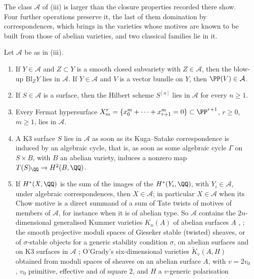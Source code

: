 The class $\mathcal{A}$ of (iii) is larger than the
closure properties recorded there show. Four further operations
preserve it, the last of them domination by correspondences, which brings in
the varieties whose motives are known to be built from those of abelian
varieties, and two classical families lie in it.

\begin{proposition}\label{prop:aclosure}
Let $\mathcal{A}$ be as in (iii).
\begin{enumerate}[label=\textup{(\roman*)},leftmargin=2.6em,itemsep=2pt]
\item If $Y\in\mathcal{A}$ and $Z\subset Y$ is a smooth closed subvariety
  with $Z\in\mathcal{A}$, then the blow-up $\mathrm{Bl}_{Z}Y$ lies in
  $\mathcal{A}$. If $Y\in\mathcal{A}$ and $V$ is a vector bundle on $Y$,
  then $\PP(V)\in\mathcal{A}$.
\item If $S\in\mathcal{A}$ is a surface, then the Hilbert scheme $S^{[n]}$
  lies in $\mathcal{A}$ for every $n\ge1$.
\item Every Fermat hypersurface
  $X^{r}_{m}=\{x_{0}^{m}+\dots+x_{r+1}^{m}=0\}\subset\PP^{r+1}$, $r\ge0$,
  $m\ge1$, lies in $\mathcal{A}$.
\item A K3 surface $S$ lies in $\mathcal{A}$ as soon as its Kuga--Satake
  correspondence is induced by an algebraic cycle, that is, as soon as some
  algebraic cycle $\Gamma$ on $S\times B$, with $B$ an abelian variety,
  induces a nonzero map $T(S)_{\QQ}\to H^{2}(B,\QQ)$.
\item If $H^{*}(X,\QQ)$ is the sum of the images of the $H^{*}(Y_{i},\QQ)$,
  with $Y_{i}\in\mathcal{A}$, under algebraic correspondences, then
  $X\in\mathcal{A}$; in particular $X\in\mathcal{A}$ when its Chow motive is
  a direct summand of a sum of Tate twists of motives of members of
  $\mathcal{A}$, for instance when it is of abelian type. So $\mathcal{A}$
  contains the $2n$-dimensional generalised Kummer varieties $K_{n}(A)$ of
  abelian surfaces $A$ \cite[Theorem~2.7, Corollary~2.8]{Xu15},
  \cite[Theorem~1.5]{FTV19}; the smooth projective moduli spaces of Gieseker
  stable (twisted) sheaves, or of $\sigma$-stable objects for a generic
  stability condition $\sigma$, on abelian surfaces and on K3 surfaces in
  $\mathcal{A}$ \cite[Theorem~0.1, Remark~2.1]{Bue20}; O'Grady's
  six-dimensional varieties $\widetilde K_{v}(A,H)$ obtained from moduli
  spaces of sheaves on an abelian surface $A$, with $v=2v_{0}$, $v_{0}$
  primitive, effective and of square $2$, and $H$ a $v$-generic polarisation

\end{enumerate}
\end{proposition}
